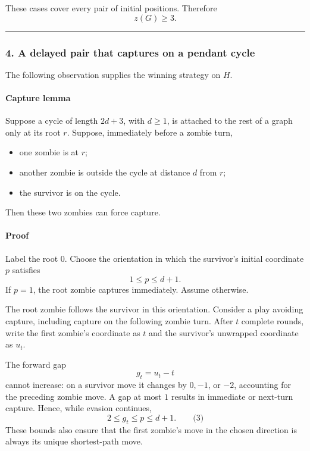 \documentclass[
  11pt,
  a4paper,
]{article}
\providecommand{\tightlist}{%
  \setlength{\itemsep}{0pt}\setlength{\parskip}{0pt}}
\begin{document}
These cases cover every pair of initial positions. Therefore \[
\boxed{z(G)\ge3.}
\]

\begin{center}\rule{0.5\linewidth}{0.5pt}\end{center}

\subsubsection{4. A delayed pair that captures on a pendant
cycle}\label{a-delayed-pair-that-captures-on-a-pendant-cycle}

The following observation supplies the winning strategy on \(H\).

\paragraph{Capture lemma}\label{capture-lemma}

Suppose a cycle of length \(2d+3\), with \(d\ge1\), is attached to the
rest of a graph only at its root \(r\). Suppose, immediately before a
zombie turn,

\begin{itemize}
\tightlist
\item
  one zombie is at \(r\);
\item
  another zombie is outside the cycle at distance \(d\) from \(r\);
\item
  the survivor is on the cycle.
\end{itemize}

Then these two zombies can force capture.

\paragraph{Proof}\label{proof-1}

Label the root \(0\). Choose the orientation in which the survivor's
initial coordinate \(p\) satisfies \[
1\le p\le d+1.
\] If \(p=1\), the root zombie captures immediately. Assume otherwise.

The root zombie follows the survivor in this orientation. Consider a
play avoiding capture, including capture on the following zombie turn.
After \(t\) complete rounds, write the first zombie's coordinate as
\(t\) and the survivor's unwrapped coordinate as \(u_t\).

The forward gap \[
g_t=u_t-t
\] cannot increase: on a survivor move it changes by \(0,-1\), or
\(-2\), accounting for the preceding zombie move. A gap at most \(1\)
results in immediate or next-turn capture. Hence, while evasion
continues, \[
2\le g_t\le p\le d+1.
\qquad\text{(3)}
\] These bounds also ensure that the first zombie's move in the chosen
direction is always its unique shortest-path move.
\end{document}
